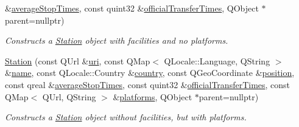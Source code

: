 \begin{DoxyCompactItemize}
\&\mbox{\hyperlink{classQRail_1_1StationEngine_1_1Station_a4747748868a77baad4dd01daac657fcf}{average\+Stop\+Times}}, const quint32 \&\mbox{\hyperlink{classQRail_1_1StationEngine_1_1Station_ad58620e2c5bf189e819165464d456d61}{official\+Transfer\+Times}}, Q\+Object $\ast$parent=nullptr)
\begin{DoxyCompactList}\small\item\em Constructs a \mbox{\hyperlink{classQRail_1_1StationEngine_1_1Station}{Station}} object with facilities and no platforms. \end{DoxyCompactList}\item 
\mbox{\hyperlink{classQRail_1_1StationEngine_1_1Station_a14101dfd927e5bfd379a4121abaef363}{Station}} (const Q\+Url \&\mbox{\hyperlink{classQRail_1_1StationEngine_1_1Station_a7ccf866501e2f547935c152b67d192f6}{uri}}, const Q\+Map$<$ Q\+Locale\+::\+Language, Q\+String $>$ \&\mbox{\hyperlink{classQRail_1_1StationEngine_1_1Station_a8c1f3e4a33f26db9f6ca31798b115338}{name}}, const Q\+Locale\+::\+Country \&\mbox{\hyperlink{classQRail_1_1StationEngine_1_1Station_a07e74b4f39a2fc67d20243a39226f0db}{country}}, const Q\+Geo\+Coordinate \&\mbox{\hyperlink{classQRail_1_1StationEngine_1_1Station_a139e180c6a82519db7b4b6249aa4b353}{position}}, const qreal \&\mbox{\hyperlink{classQRail_1_1StationEngine_1_1Station_a4747748868a77baad4dd01daac657fcf}{average\+Stop\+Times}}, const quint32 \&\mbox{\hyperlink{classQRail_1_1StationEngine_1_1Station_ad58620e2c5bf189e819165464d456d61}{official\+Transfer\+Times}}, const Q\+Map$<$ Q\+Url, Q\+String $>$ \&\mbox{\hyperlink{classQRail_1_1StationEngine_1_1Station_abc2d6647137da855d877a7061a261bc8}{platforms}}, Q\+Object $\ast$parent=nullptr)
\begin{DoxyCompactList}\small\item\em Constructs a \mbox{\hyperlink{classQRail_1_1StationEngine_1_1Station}{Station}} object without facilities, but with platforms. \end{DoxyCompactList}\item 
$$
\end{DoxyCompactItemize}
